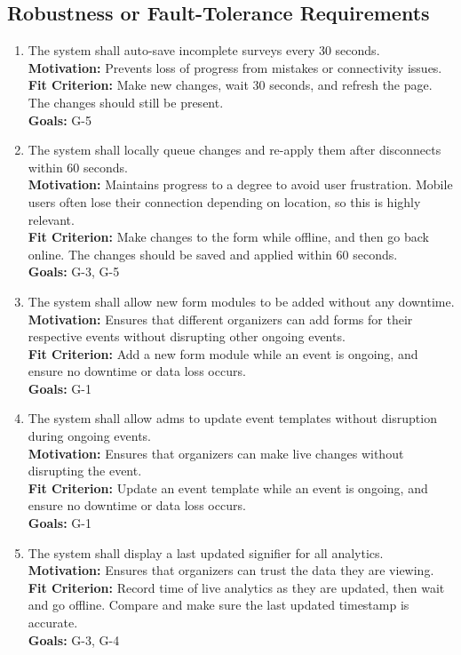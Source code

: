 \documentclass[12pt]{article}
\begin{document}
\subsection{Robustness or Fault-Tolerance Requirements}
\begin{enumerate}[label=\bfseries FT-\arabic*:, wide=0pt, leftmargin=*, ref=\bfseries FT-\arabic*]
  \item \label{FT1} The system shall auto-save incomplete surveys every 30 seconds.\\
  {\bf Motivation:} Prevents loss of progress from mistakes or connectivity issues.\\
  {\bf Fit Criterion:} Make new changes, wait 30 seconds, and refresh the page. The changes should still be present.\\
  {\bf Goals:} G-5
  \item \label{FT2} The system shall locally queue changes and re-apply them after disconnects within 60 seconds.\\
  {\bf Motivation:} Maintains progress to a degree to avoid user frustration. Mobile users often lose their connection depending on location, so this is highly relevant.\\
  {\bf Fit Criterion:} Make changes to the form while offline, and then go back online. The changes should be saved and applied within 60 seconds.\\
  {\bf Goals:} G-3, G-5
  \item \label{FT3} The system shall allow new form modules to be added without any downtime.\\
  {\bf Motivation:} Ensures that different organizers can add forms for their respective events without disrupting other ongoing events.\\
  {\bf Fit Criterion:} Add a new form module while an event is ongoing, and ensure no downtime or data loss occurs.\\
  {\bf Goals:} G-1
  \item \label{FT4} The system shall allow \glspl{adm} to update event templates without disruption
    during ongoing events.\\
  {\bf Motivation:} Ensures that organizers can make live changes without disrupting the event.\\
  {\bf Fit Criterion:} Update an event template while an event is ongoing, and ensure no downtime or data loss occurs.\\
  {\bf Goals:} G-1
  \item \label{FT5} The system shall display a last updated signifier for all analytics.\\
  {\bf Motivation:} Ensures that organizers can trust the data they are viewing.\\
  {\bf Fit Criterion:} Record time of live analytics as they are updated, then wait and go offline. Compare and make sure the last updated timestamp is accurate.\\
  {\bf Goals:} G-3, G-4
  \end{enumerate}
\end{document}
